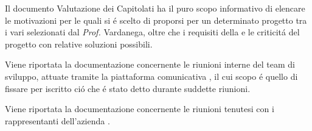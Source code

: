 Il documento Valutazione dei Capitolati ha il puro scopo informativo di elencare le motivazioni per le quali si é scelto di proporsi per un determinato progetto tra i vari selezionati dal \textit{Prof.} Vardanega, oltre che i requisiti della  e le criticitá del progetto con relative soluzioni possibili.  

Viene riportata la documentazione concernente le riunioni interne del team di sviluppo, attuate tramite la piattaforma comunicativa , il cui scopo é quello di fissare per iscritto ció che é stato detto durante suddette riunioni. %

Viene riportata la documentazione concernente le riunioni tenutesi con i rappresentanti dell'azienda . %